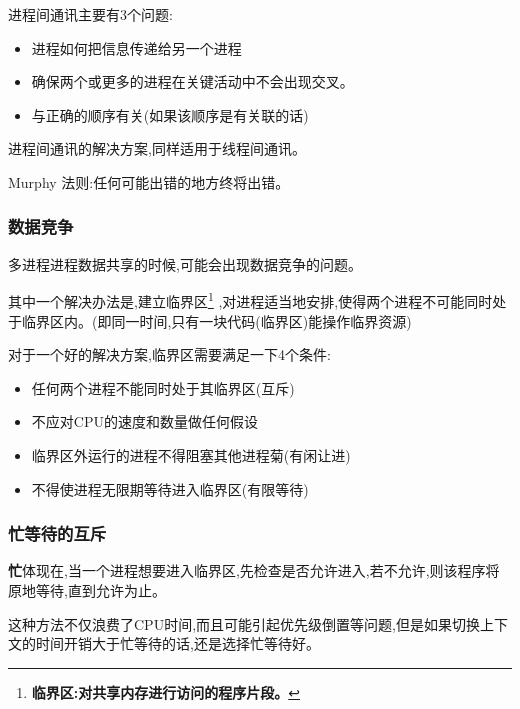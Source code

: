 \documentclass[UTF8,a4paper]{ctexart}
\begin{document}
    进程间通讯主要有3个问题:
    \begin{itemize}
      \item 进程如何把信息传递给另一个进程
      \item 确保两个或更多的进程在关键活动中不会出现交叉。
      \item 与正确的顺序有关(如果该顺序是有关联的话)
    \end{itemize}

    进程间通讯的解决方案,同样适用于线程间通讯。

    {\color{blue}Murphy 法则:任何可能出错的地方终将出错。}

    \subsubsection{数据竞争}
    多进程进程数据共享的时候,可能会出现数据竞争的问题。

    其中一个解决办法是,建立临界区\footnote{\textbf{临界区:对共享内存进行访问的程序片段。}}
    ,对进程适当地安排,使得两个进程不可能同时处于临界区内。(即同一时间,只有一块代码(临界区)能操作临界资源)

    对于一个好的解决方案,临界区需要满足一下4个条件:
    \begin{itemize}
      \item 任何两个进程不能同时处于其临界区(互斥)
      \item 不应对CPU的速度和数量做任何假设
      \item 临界区外运行的进程不得阻塞其他进程菊(有闲让进)
      \item 不得使进程无限期等待进入临界区(有限等待)
    \end{itemize}

    \subsubsection{忙等待的互斥}
    \textbf{忙}体现在,当一个进程想要进入临界区,先检查是否允许进入,若不允许,则该程序将原地等待,直到允许为止。

    这种方法不仅浪费了CPU时间,而且可能引起优先级倒置等问题,但是如果切换上下文的时间开销大于忙等待的话,还是选择忙等待好。
\end{document}
